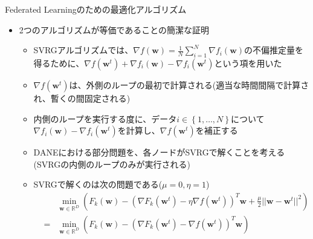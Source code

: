 \documentclass[dvipdfmx,notheorems,t]{beamer}
\begin{document}
\begin{frame}{Federated Learningのための最適化アルゴリズム}

\begin{itemize}
	\item 2つのアルゴリズムが等価であることの簡潔な証明
	\begin{itemize}
		\item SVRGアルゴリズムでは、$\nabla f(\bm{w}) = \frac{1}{N} \sum_{i = 1}^N \nabla f_i(\bm{w})$の不偏推定量を得るために、$\nabla f(\bm{w}^t) + \nabla f_i(\bm{w}) - \nabla f_i(\bm{w}^t)$という項を用いた
		\newline
		\item $\nabla f(\bm{w}^t)$は、外側のループの最初で計算される(適当な時間間隔で計算され、暫くの間固定される)
		\item 内側のループを実行する度に、データ$i \in \left\{ 1, \ldots, N \right\}$について$\nabla f_i(\bm{w}) - \nabla f_i(\bm{w}^t)$を計算し、$\nabla f(\bm{w}^t)$を補正する
		\newline
		
		\item DANEにおける部分問題を、各ノードがSVRGで解くことを考える(SVRGの\alert{内側のループのみ}が実行される)
		\item SVRGで解くのは次の問題である($\mu = 0, \eta = 1$)
		\begin{eqnarray}
			&& \min_{\bm{w} \in \mathbb{R}^D} \left( F_k(\bm{w}) - \left( \nabla F_k(\bm{w}^t) - \eta \nabla f(\bm{w}^t) \right)^T \bm{w} + \frac{\mu}{2} || \bm{w} - \bm{w}^t ||^2 \right) \nonumber \\
			&=& \min_{\bm{w} \in \mathbb{R}^D} \left( F_k(\bm{w}) - \left( \nabla F_k(\bm{w}^t) - \nabla f(\bm{w}^t) \right)^T \bm{w} \right)
		\end{eqnarray}
	\end{itemize}
\end{itemize}

\end{frame}
\end{document}
